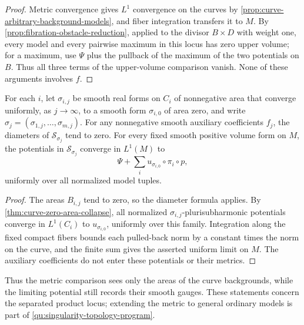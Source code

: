 \begin{proof}
Metric convergence gives $L^1$ convergence on the curves by \cref{prop:curve-arbitrary-background-models}, and fiber integration transfers it to $M$. By \cref{prop:fibration-obstacle-reduction}, applied to the divisor $B\times D$ with weight one, every model and every pairwise maximum in this locus has zero upper volume; for a maximum, use $\Psi$ plus the pullback of the maximum of the two potentials on $B$. Thus all three terms of the upper-volume comparison vanish. None of these arguments involves $f$.
\end{proof}

\begin{corollary}\label{cor:arbitrary-product-zero-area-collapse}
For each $i$, let $\sigma_{i,j}$ be smooth real forms on $C_i$ of nonnegative area that converge uniformly, as $j\to\infty$, to a smooth form $\sigma_{i,0}$ of area zero, and write $\sigma_j=(\sigma_{1,j},\ldots,\sigma_{m,j})$. For any nonnegative smooth auxiliary coefficients $f_j$, the diameters of $\mathcal S_{\sigma_j}$ tend to zero. For every fixed smooth positive volume form on $M$, the potentials in $\mathcal S_{\sigma_j}$ converge in $L^1(M)$ to
\[
 \Psi+\sum_i u_{\sigma_{i,0}}\circ\pi_i\circ p,
\]
uniformly over all normalized model tuples.
\end{corollary}
\begin{proof}
The areas $B_{i,j}$ tend to zero, so the diameter formula applies. By \cref{thm:curve-zero-area-collapse}, all normalized $\sigma_{i,j}$-plurisubharmonic potentials converge in $L^1(C_i)$ to $u_{\sigma_{i,0}}$, uniformly over this family. Integration along the fixed compact fibers bounds each pulled-back norm by a constant times the norm on the curve, and the finite sum gives the asserted uniform limit on $M$. The auxiliary coefficients do not enter these potentials or their metrics.
\end{proof}

Thus the metric comparison sees only the areas of the curve backgrounds, while the limiting potential still records their smooth gauges. These statements concern the separated product locus; extending the metric to general ordinary models is part of \cref{qu:singularity-topology-program}.
